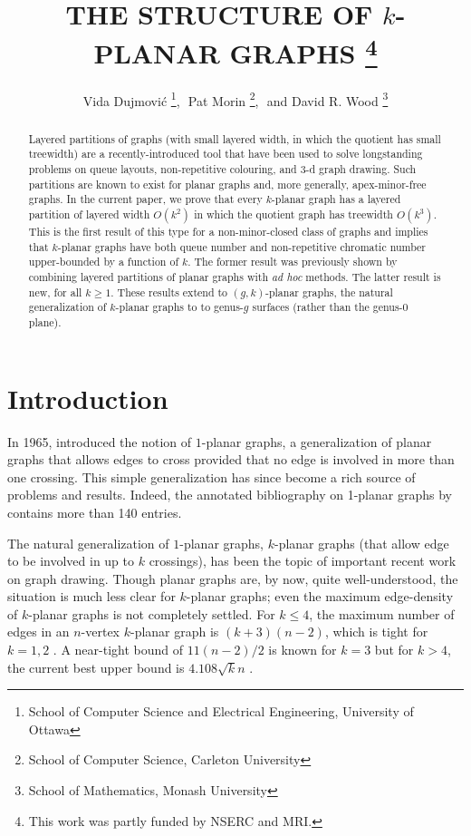 \documentclass{patmorin}
\title{\MakeUppercase{The Structure of $k$-Planar Graphs}%
    \thanks{This work was partly funded by NSERC and MRI.}}
\author{Vida Dujmović%
        \thanks{School of Computer Science and Electrical Engineering,
                University of Ottawa},\,\,
        Pat Morin%
        \thanks{School of Computer Science, Carleton University},\,\, and
        David R. Wood%
        \thanks{School of Mathematics, Monash University}}
\begin{document}
\begin{titlepage}
\maketitle


\begin{abstract}
  Layered partitions of graphs (with small layered width, in which the quotient has small treewidth) are a recently-introduced tool that have been used to solve longstanding problems on queue layouts, non-repetitive colouring, and 3-d graph drawing.  Such partitions are known to exist for planar graphs and, more generally, apex-minor-free graphs.  In the current paper, we prove that every $k$-planar graph has a layered partition of layered width $O(k^2)$ in  which the quotient graph has treewidth $O(k^3)$. This is the first result of this type for a non-minor-closed class of graphs and implies that $k$-planar graphs have both queue number and non-repetitive chromatic number upper-bounded by a function of $k$. The former result was previously shown by combining layered partitions of planar graphs with \textit{ad hoc} methods. The latter result is new, for all $k\ge 1$.  These results extend to $(g,k)$-planar graphs, the natural generalization of $k$-planar graphs to to genus-$g$ surfaces (rather than the genus-$0$ plane).
\end{abstract}
\end{titlepage}

\tableofcontents
\newpage
\section{Introduction}

In 1965, \citet{ringel:sechsfarbenproblem} introduced the notion of $1$-planar graphs, a generalization of planar graphs that allows edges to cross provided that no edge is involved in more than one crossing. This simple generalization has since become a rich source of problems and results.  Indeed, the annotated bibliography on 1-planar graphs by \cite{kobourov.liotta.ea:annotated} contains more than 140 entries.

The natural generalization of $1$-planar graphs, $k$-planar graphs (that allow edge to be involved in up to $k$ crossings), has been the topic of important recent work on graph drawing. Though planar graphs are, by now, quite well-understood, the situation is much less clear for $k$-planar graphs; even the maximum edge-density of $k$-planar graphs is not completely settled.  For $k\le 4$, the maximum number of edges in an $n$-vertex $k$-planar graph is $(k+3)(n-2)$, which is tight for $k=1,2$ \cite{pach.toth:graphs}.  A near-tight bound of $11(n-2)/2$ is known for $k=3$ \cite{pach.radoicic.ea:improving} but for $k>4$, the current best upper bound is $4.108\sqrt{k}n$ \cite{pach.toth:graphs}.
\end{document}
